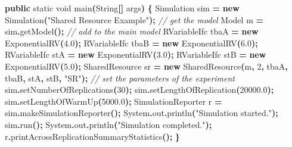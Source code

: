 \documentclass[
]{book}
\newenvironment{Shaded}{\begin{snugshade}}{\end{snugshade}}
\newcommand{\BuiltInTok}[1]{#1}
\newcommand{\CommentTok}[1]{\textcolor[rgb]{0.56,0.35,0.01}{\textit{#1}}}
\newcommand{\DataTypeTok}[1]{\textcolor[rgb]{0.13,0.29,0.53}{#1}}
\newcommand{\DecValTok}[1]{\textcolor[rgb]{0.00,0.00,0.81}{#1}}
\newcommand{\FloatTok}[1]{\textcolor[rgb]{0.00,0.00,0.81}{#1}}
\newcommand{\FunctionTok}[1]{\textcolor[rgb]{0.00,0.00,0.00}{#1}}
\newcommand{\KeywordTok}[1]{\textcolor[rgb]{0.13,0.29,0.53}{\textbf{#1}}}
\newcommand{\NormalTok}[1]{#1}
\newcommand{\OperatorTok}[1]{\textcolor[rgb]{0.81,0.36,0.00}{\textbf{#1}}}
\newcommand{\StringTok}[1]{\textcolor[rgb]{0.31,0.60,0.02}{#1}}
\theoremstyle{definition}
\theoremstyle{definition}
\theoremstyle{definition}
\theoremstyle{definition}
\theoremstyle{remark}
\begin{document}
\begin{Shaded}
\begin{Highlighting}[]
    \KeywordTok{public} \DataTypeTok{static} \DataTypeTok{void} \FunctionTok{main}\OperatorTok{(}\BuiltInTok{String}\OperatorTok{[]}\NormalTok{ args}\OperatorTok{)} \OperatorTok{\{}
\NormalTok{        Simulation sim }\OperatorTok{=} \KeywordTok{new} \FunctionTok{Simulation}\OperatorTok{(}\StringTok{"Shared Resource Example"}\OperatorTok{);}
        \CommentTok{// get the model}
\NormalTok{        Model m }\OperatorTok{=}\NormalTok{ sim}\OperatorTok{.}\FunctionTok{getModel}\OperatorTok{();}
        \CommentTok{// add to the main model}
\NormalTok{        RVariableIfc tbaA }\OperatorTok{=} \KeywordTok{new} \FunctionTok{ExponentialRV}\OperatorTok{(}\FloatTok{4.0}\OperatorTok{);}
\NormalTok{        RVariableIfc tbaB }\OperatorTok{=} \KeywordTok{new} \FunctionTok{ExponentialRV}\OperatorTok{(}\FloatTok{6.0}\OperatorTok{);}
\NormalTok{        RVariableIfc stA }\OperatorTok{=} \KeywordTok{new} \FunctionTok{ExponentialRV}\OperatorTok{(}\FloatTok{3.0}\OperatorTok{);}
\NormalTok{        RVariableIfc stB }\OperatorTok{=} \KeywordTok{new} \FunctionTok{ExponentialRV}\OperatorTok{(}\FloatTok{5.0}\OperatorTok{);}
\NormalTok{        SharedResource sr }\OperatorTok{=} \KeywordTok{new} \FunctionTok{SharedResource}\OperatorTok{(}\NormalTok{m}\OperatorTok{,} \DecValTok{2}\OperatorTok{,}\NormalTok{ tbaA}\OperatorTok{,}\NormalTok{ tbaB}\OperatorTok{,}\NormalTok{ stA}\OperatorTok{,}\NormalTok{ stB}\OperatorTok{,} \StringTok{"SR"}\OperatorTok{);}
        \CommentTok{// set the parameters of the experiment}
\NormalTok{        sim}\OperatorTok{.}\FunctionTok{setNumberOfReplications}\OperatorTok{(}\DecValTok{30}\OperatorTok{);}
\NormalTok{        sim}\OperatorTok{.}\FunctionTok{setLengthOfReplication}\OperatorTok{(}\FloatTok{20000.0}\OperatorTok{);}
\NormalTok{        sim}\OperatorTok{.}\FunctionTok{setLengthOfWarmUp}\OperatorTok{(}\FloatTok{5000.0}\OperatorTok{);}
\NormalTok{        SimulationReporter r }\OperatorTok{=}\NormalTok{ sim}\OperatorTok{.}\FunctionTok{makeSimulationReporter}\OperatorTok{();}
        \BuiltInTok{System}\OperatorTok{.}\FunctionTok{out}\OperatorTok{.}\FunctionTok{println}\OperatorTok{(}\StringTok{"Simulation started."}\OperatorTok{);}
\NormalTok{        sim}\OperatorTok{.}\FunctionTok{run}\OperatorTok{();}
        \BuiltInTok{System}\OperatorTok{.}\FunctionTok{out}\OperatorTok{.}\FunctionTok{println}\OperatorTok{(}\StringTok{"Simulation completed."}\OperatorTok{);}
\NormalTok{        r}\OperatorTok{.}\FunctionTok{printAcrossReplicationSummaryStatistics}\OperatorTok{();}
    \OperatorTok{\}}
\end{Highlighting}
\end{Shaded}
\end{document}
